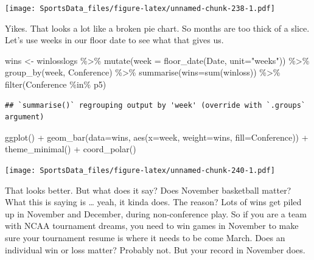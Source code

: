 \documentclass[
]{book}
\newenvironment{Shaded}{\begin{snugshade}}{\end{snugshade}}
\newcommand{\AttributeTok}[1]{\textcolor[rgb]{0.77,0.63,0.00}{#1}}
\newcommand{\FunctionTok}[1]{\textcolor[rgb]{0.00,0.00,0.00}{#1}}
\newcommand{\NormalTok}[1]{#1}
\newcommand{\OtherTok}[1]{\textcolor[rgb]{0.56,0.35,0.01}{#1}}
\newcommand{\SpecialCharTok}[1]{\textcolor[rgb]{0.00,0.00,0.00}{#1}}
\newcommand{\StringTok}[1]{\textcolor[rgb]{0.31,0.60,0.02}{#1}}
\begin{document}
\texttt{[image: SportsData\_files/figure-latex/unnamed-chunk-238-1.pdf]}

Yikes. That looks a lot like a broken pie chart. So months are too thick of a slice. Let's use weeks in our floor date to see what that gives us.

\begin{Shaded}
\begin{Highlighting}[]
\NormalTok{wins }\OtherTok{\textless{}{-}}\NormalTok{ winlosslogs }\SpecialCharTok{\%\textgreater{}\%} \FunctionTok{mutate}\NormalTok{(}\AttributeTok{week =} \FunctionTok{floor\_date}\NormalTok{(Date, }\AttributeTok{unit=}\StringTok{"weeks"}\NormalTok{)) }\SpecialCharTok{\%\textgreater{}\%} \FunctionTok{group\_by}\NormalTok{(week, Conference) }\SpecialCharTok{\%\textgreater{}\%} \FunctionTok{summarise}\NormalTok{(}\AttributeTok{wins=}\FunctionTok{sum}\NormalTok{(winloss)) }\SpecialCharTok{\%\textgreater{}\%} \FunctionTok{filter}\NormalTok{(Conference }\SpecialCharTok{\%in\%}\NormalTok{ p5) }
\end{Highlighting}
\end{Shaded}

\begin{verbatim}
## `summarise()` regrouping output by 'week' (override with `.groups` argument)
\end{verbatim}

\begin{Shaded}
\begin{Highlighting}[]
\FunctionTok{ggplot}\NormalTok{() }\SpecialCharTok{+} \FunctionTok{geom\_bar}\NormalTok{(}\AttributeTok{data=}\NormalTok{wins, }\FunctionTok{aes}\NormalTok{(}\AttributeTok{x=}\NormalTok{week, }\AttributeTok{weight=}\NormalTok{wins, }\AttributeTok{fill=}\NormalTok{Conference)) }\SpecialCharTok{+} \FunctionTok{theme\_minimal}\NormalTok{() }\SpecialCharTok{+} \FunctionTok{coord\_polar}\NormalTok{()}
\end{Highlighting}
\end{Shaded}

\texttt{[image: SportsData\_files/figure-latex/unnamed-chunk-240-1.pdf]}

That looks better. But what does it say? Does November basketball matter? What this is saying is \ldots{} yeah, it kinda does. The reason? Lots of wins get piled up in November and December, during non-conference play. So if you are a team with NCAA tournament dreams, you need to win games in November to make sure your tournament resume is where it needs to be come March. Does an individual win or loss matter? Probably not. But your record in November does.
\end{document}
